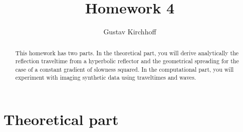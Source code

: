 \author{Gustav Kirchhoff} 
\title{Homework 4}

\begin{abstract}
  This homework has two parts. In the theoretical part, you will
  derive analytically the reflection traveltime from a hyperbolic
  reflector and the geometrical spreading for the case of a constant
  gradient of slowness squared.  In the computational part, you will
  experiment with imaging synthetic data using traveltimes and waves.
\end{abstract}

\lstset{language=python,numbers=left,numberstyle=\tiny,showstringspaces=false}

\section{Theoretical part}

